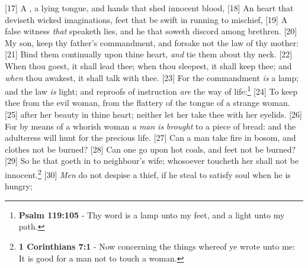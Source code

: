 [17] \textcolor[cmyk]{0.99998,1,0,0}{A , a lying tongue, and hands that shed innocent blood,}
[18] \textcolor[cmyk]{0.99998,1,0,0}{An heart that deviseth wicked imaginations, feet that be swift in running to mischief,}
[19] \textcolor[cmyk]{0.99998,1,0,0}{A false witness \emph{that} speaketh lies, and he that soweth discord among brethren.}
[20] \textcolor[cmyk]{0.99998,1,0,0}{My son, keep thy father's commandment, and forsake not the law of thy mother:}
[21] \textcolor[cmyk]{0.99998,1,0,0}{Bind them continually upon thine heart, \emph{and} tie them about thy neck.}
[22] \textcolor[cmyk]{0.99998,1,0,0}{When thou goest, it shall lead thee; when thou sleepest, it shall keep thee; and \emph{when} thou awakest, it shall talk with thee.}
[23] \textcolor[cmyk]{0.99998,1,0,0}{For the commandment \emph{is} a lamp; and the law \emph{is} light; and reproofs of instruction \emph{are} the way of life:}\footnote{\textbf{Psalm 119:105} - Thy word is a lamp unto my feet, and a light unto my path.}
[24] \textcolor[cmyk]{0.99998,1,0,0}{To keep thee from the evil woman, from the flattery of the tongue of a strange woman.}
[25] \textcolor[cmyk]{0.99998,1,0,0}{ after her beauty in thine heart; neither let her take thee with her eyelids.}
[26] \textcolor[cmyk]{0.99998,1,0,0}{For by means of a whorish woman \emph{a} \emph{man} \emph{is} \emph{brought} to a piece of bread: and the adulteress will hunt for the precious life.}
[27] \textcolor[cmyk]{0.99998,1,0,0}{Can a man take fire in  bosom, and  clothes not be burned?}
[28] \textcolor[cmyk]{0.99998,1,0,0}{Can one go upon hot coals, and  feet not be burned?}
[29] \textcolor[cmyk]{0.99998,1,0,0}{So he that goeth in to  neighbour's wife; whosoever toucheth her shall not be innocent.}\footnote{\textbf{1 Corinthians 7:1} - Now concerning the things whereof ye wrote unto me: It is good for a man not to touch a woman.}
[30] \textcolor[cmyk]{0.99998,1,0,0}{\emph{Men} do not despise a thief, if he steal to satisfy  soul when he is hungry;}
